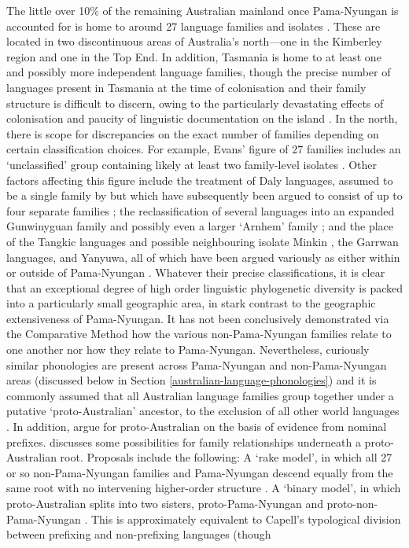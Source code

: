 The little over 10\% of the remaining Australian mainland once Pama-Nyungan is accounted for is home to around 27 language families and isolates \autocite{evans_non-pama-nyungan_2003}. These are located in two discontinuous areas of Australia's north---one in the Kimberley region and one in the Top End. In addition, Tasmania is home to at least one and possibly more independent language families, though the precise number of languages present in Tasmania at the time of colonisation and their family structure is difficult to discern, owing to the particularly devastating effects of colonisation and paucity of linguistic documentation on the island \autocite{bowern_riddle_2012}. In the north, there is scope for discrepancies on the exact number of families depending on certain classification choices. For example, Evans' figure of 27 families includes an `unclassified' group containing likely at least two family-level isolates \autocite[p.~11]{evans_non-pama-nyungan_2003}. Other factors affecting this figure include the treatment of Daly languages, assumed to be a single family by \textcite{tryon_daly_1974} but which have subsequently been argued to consist of up to four separate families \autocite[ch.~4--7]{evans_non-pama-nyungan_2003}; the reclassification of several languages into an expanded Gunwinyguan family and possibly even a larger `Arnhem' family \autocite[p.~14--15]{evans_non-pama-nyungan_2003}; and the place of the Tangkic languages and possible neighbouring isolate Minkin \autocites{evans_minkin_1990}{memmott_fission_2016}, the Garrwan languages, and Yanyuwa, all of which have been argued variously as either within or outside of Pama-Nyungan \autocite[p.~12]{evans_non-pama-nyungan_2003}. Whatever their precise classifications, it is clear that an exceptional degree of high order linguistic phylogenetic diversity is packed into a particularly small geographic area, in stark contrast to the geographic extensiveness of Pama-Nyungan. It has not been conclusively demonstrated via the Comparative Method how the various non-Pama-Nyungan families relate to one another nor how they relate to Pama-Nyungan. Nevertheless, curiously similar phonologies are present across Pama-Nyungan and non-Pama-Nyungan areas (discussed below in Section \ref{australian-language-phonologies}) and it is commonly assumed that all Australian language families group together under a putative `proto-Australian' ancestor, to the exclusion of all other world languages \autocite[e.g.@dixon\_languages\_1980;][]{hamilton_phonetic_1996}. In addition, \textcite{harvey_reconstructing_2017} argue for proto-Australian on the basis of evidence from nominal prefixes. \textcite{evans_non-pama-nyungan_2003} discusses some possibilities for family relationships underneath a proto-Australian root. Proposals include the following: A `rake model', in which all 27 or so non-Pama-Nyungan families and Pama-Nyungan descend equally from the same root with no intervening higher-order structure \autocite{ogrady_languages_1966}. A `binary model', in which proto-Australian splits into two sisters, proto-Pama-Nyungan and proto-non-Pama-Nyungan \autocite{heath_linguistic_1978}. This is approximately equivalent to Capell's \autocite*{capell_new_1956} typological division between prefixing and non-prefixing languages (though 